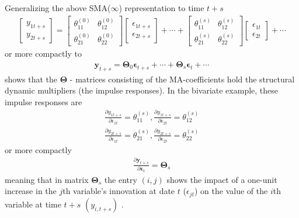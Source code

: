 \documentclass[a4paper,11pt,listof=nochaptergap,oneside,pointednumbers,bibtotoc,bigheadings,liststotoc,hidelinks]{scrbook}
\theoremstyle{mysatz}
\theoremstyle{mydefinition}
\theoremstyle{mytheorem}
\theoremstyle{mybemerkung}
\newcommand{\vect}[1]{\boldsymbol{\mathbf{#1}}}
\begin{document}
Generalizing the above SMA($\infty$) representation to time $t+s$ \citep{zivot:00}
\begin{equation} \label{eq:svar10}
\begin{split}
	\begin{bmatrix}
    	y_{1t+s} \\
    	y_{2t+s}
 	\end{bmatrix} 
	=
	\begin{bmatrix}
    	\theta_{11}^{(0)} & \theta_{12}^{(0)}\\
    	\theta_{21}^{(0)} & \theta_{22}^{(0)}
 	\end{bmatrix} 
	\begin{bmatrix}
    	\epsilon_{1t + s} \\
	\epsilon_{2t+s}
 	\end{bmatrix} + \cdots +
	\begin{bmatrix}
    	\theta_{11}^{(s)} & \theta_{12}^{(s)}\\
    	\theta_{21}^{(s)} & \theta_{22}^{(s)}
 	\end{bmatrix} 
	\begin{bmatrix}
    	\epsilon_{1t} \\
	\epsilon_{2t}
 	\end{bmatrix} + \cdots 
\end{split}								
\end{equation}
or more compactly to 
\begin{equation} \label{eq:svar8_1}
\begin{split}
 		\vect{y}_{t+s} = 
		\vect{\Theta}_0\vect{\epsilon}_{t+s} + \cdots + \vect{\Theta}_s\vect{\epsilon}_{t} + \cdots
\end{split}								
\end{equation}
shows that the $\vect{\Theta}$ - matrices consisting of the MA-coefficients hold the structural dynamic multipliers (the impulse responses). In the bivariate example, these impulse responses are
\begin{equation} \label{eq:svar9}
\begin{split}
 		\frac{\partial y_{1t+s}}{\partial \epsilon_{1t}} = \theta_{11}^{(s)}, \frac{\partial y_{1t+s}}{\partial \epsilon_{2t}} = \theta_{12}^{(s)} \\
		\frac{\partial y_{2t+s}}{\partial \epsilon_{1t}} = \theta_{21}^{(s)}, \frac{\partial y_{2t+s}}{\partial \epsilon_{2t}} = \theta_{22}^{(s)}
\end{split}								
\end{equation}
or more compactly 
\begin{equation} \label{eq:svar10}
\begin{split}
 		\frac{\partial \vect{y}_{t+s}}{\partial \vect{\epsilon}_{t}} =  \vect{\Theta}_s
\end{split}								
\end{equation}
meaning that in matrix $\vect{\Theta}_s$ the entry $(i, j)$ shows the impact of a one-unit increase in the $j$th variable's innovation at date $t$ ($\epsilon_{jt}$) on the value of the $i$th variable at time $t+s$ $(y_{i, t + s})$ \citep{zivot:00}.
\end{document}

